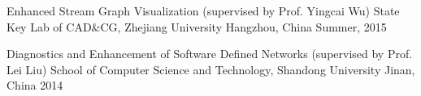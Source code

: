 

\begin{cventries}

  \cventry
    {Enhanced Stream Graph Visualization (supervised by Prof. Yingcai Wu)} %
    {State Key Lab of CAD\&CG, Zhejiang University} %
    {Hangzhou, China} %
    {Summer, 2015} %
    {}
  \vspace{-4mm}

  \cventry
    {Diagnostics and Enhancement of Software Defined Networks (supervised by Prof. Lei Liu)}
    {School of Computer Science and Technology, Shandong University}
    {Jinan, China}
    {2014}
    {}

\end{cventries}
\vspace{-5mm}
